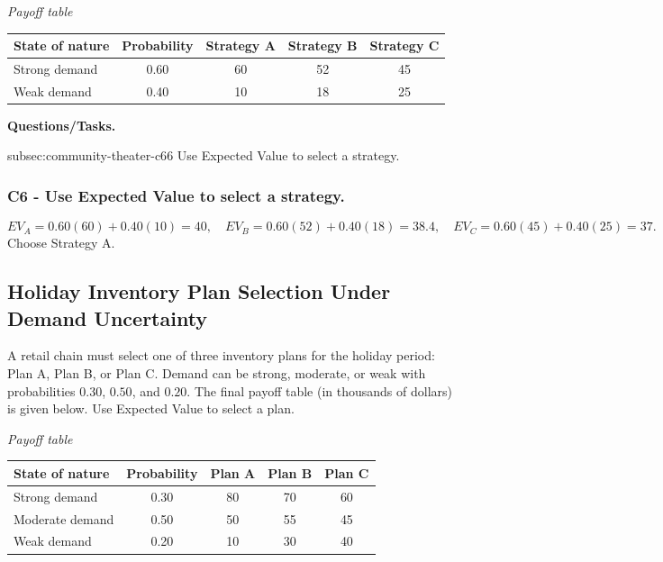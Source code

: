     \begin{center}
        \textit{Payoff table} \\
        \begin{tabular}{l c c c c}
            \toprule
            State of nature & Probability & Strategy A & Strategy B & Strategy C \\
            \midrule
            Strong demand & 0.60 & 60 & 52 & 45 \\
            Weak demand & 0.40 & 10 & 18 & 25 \\
            \bottomrule
        \end{tabular}
    \end{center}

    \textbf{Questions/Tasks.}
\begin{enumerate}
    \CriterionTask
    {subsec:community-theater-c6}{6}
    {Use Expected Value to select a strategy.}
\end{enumerate}

\subsubsection*{C6 - Use Expected Value to select a strategy.}
\label{subsec:community-theater-c6}

\[
    EV_A=0.60(60)+0.40(10)=40,\quad EV_B=0.60(52)+0.40(18)=38.4,\quad EV_C=0.60(45)+0.40(25)=37.
\]
Choose Strategy A.


\subsection{Holiday Inventory Plan Selection Under Demand Uncertainty}
\label{sec:holiday-inventory-plan}
    A retail chain must select one of three inventory plans for the holiday period: Plan A, Plan B, or Plan C.
    Demand can be strong, moderate, or weak with probabilities $0.30$, $0.50$, and $0.20$. The final payoff table
    (in thousands of dollars) is given below. Use Expected Value to select a plan.

    \begin{center}
        \textit{Payoff table} \\
        \begin{tabular}{l c c c c}
            \toprule
            State of nature & Probability & Plan A & Plan B & Plan C \\
            \midrule
            Strong demand & 0.30 & 80 & 70 & 60 \\
            Moderate demand & 0.50 & 50 & 55 & 45 \\
            Weak demand & 0.20 & 10 & 30 & 40 \\
            \bottomrule
        \end{tabular}
    \end{center}

